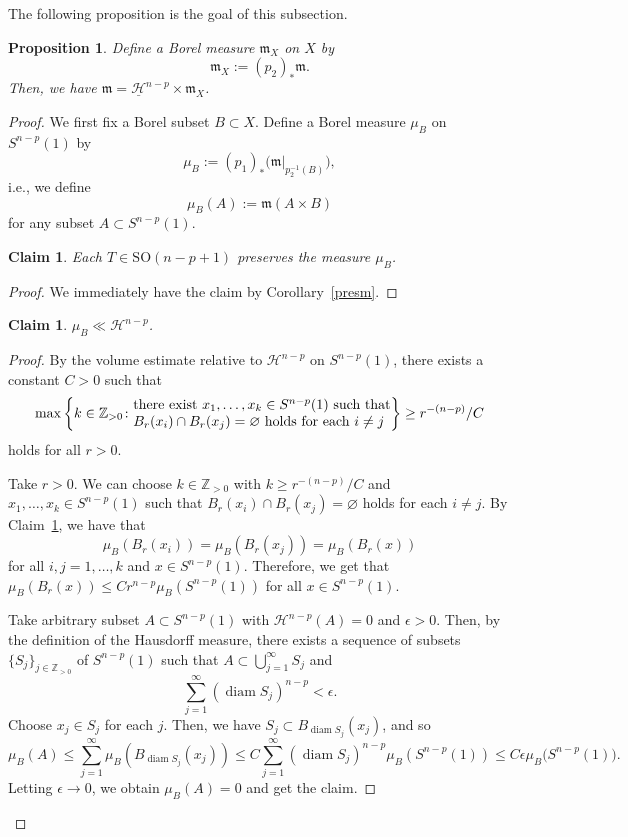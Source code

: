 \documentclass[pdftex]{sigma}
\numberwithin{equation}{section}
\newtheorem{Prop}[Thm]{Proposition}
\newtheorem{Clm}[Thm]{Claim}
\theoremstyle{definition}
\newcommand{\diam}{\operatorname{diam}}
\newcommand{\Z}{\mathbb{Z}}
\newcommand{\mf}{\mathfrak{m}}
\newcommand{\Ha}{\mathcal{H}}
\newcommand{\nHa}{\underline{\mathcal{H}}}
\begin{document}
The following proposition is the goal of this subsection.
\begin{Prop}\label{spms}
Define a Borel measure $\mf_X$ on $X$ by
\[
\mf_X:=(p_2)_\ast \mf.
\]
Then, we have $\mf=\nHa^{n-p}\times \mf_X$.
\end{Prop}
\begin{proof}
We first fix a Borel subset $B\subset X$. Define a Borel measure $\mu_B$ on $S^{n-p}(1)$ by
\[
\mu_B:=(p_1)_\ast \big(\mf|_{p_2^{-1}(B)}\big),
\]
i.e., we define
\[
\mu_B(A):=\mf(A\times B)
\]
for any subset $A\subset S^{n-p}(1)$.
\begin{Clm}\label{presmu}
Each $T\in \mathrm{SO}(n-p+1)$ preserves the measure $\mu_B$.
\end{Clm}
\begin{proof}
We immediately have the claim by Corollary~\ref{presm}.
\end{proof}
\begin{Clm}\label{ac}
$\mu_B\ll \Ha^{n-p}$.
\end{Clm}
\begin{proof}
By the volume estimate relative to $\Ha^{n-p}$ on $S^{n-p}(1)$, there exists a constant $C>0$ such that
\[
\max \left\{k\in\Z_{>0}\colon
\begin{array}{@{}l@{}}\text{there exist $x_1,\ldots,x_k\in S^{n-p}(1)$ such that}\\
\text{$B_r(x_i)\cap B_r(x_j)=\varnothing$ holds for each $i\neq j$}
\end{array}
\right\}\geq r^{-(n-p)}/C
\]
holds for all $r>0$.

Take $r>0$.
We can choose $k\in\Z_{>0}$ with $k\geq r^{-(n-p)}/C$ and $x_1,\ldots, x_k\in S^{n-p}(1)$ such that $B_r(x_i)\cap B_r(x_j)=\varnothing$ holds for each $i\neq j$.
By Claim~\ref{presmu}, we have that
\[
\mu_B(B_r(x_i))=\mu_B (B_r(x_j))=\mu_B(B_r(x))
\]
for all $i,j=1,\ldots,k$ and $x\in S^{n-p}(1)$.
Therefore, we get that $\mu_B(B_r(x))\leq Cr^{n-p}\mu_B(S^{n-p}(1))$ for all $x\in S^{n-p}(1)$.

Take arbitrary subset $A\subset S^{n-p}(1)$ with $\Ha^{n-p}(A)=0$ and $\epsilon>0$.
Then, by the definition of the Hausdorff measure, there exists a sequence of subsets $\{S_j\}_{j\in\Z_{>0}}$ of $S^{n-p}(1)$ such that
$A\subset \bigcup_{j=1}^\infty S_j$ and
\[
\sum_{j=1}^\infty (\diam S_j)^{n-p}<\epsilon.
\]
Choose $x_j\in S_j$ for each $j$.
Then, we have $S_j\subset B_{\diam S_j}(x_j)$, and so
\[
\mu_B(A)\leq \sum_{j=1}^\infty\mu_B(B_{\diam S_j}(x_j))
\leq C\sum_{j=1}^\infty (\diam S_j)^{n-p}\mu_B(S^{n-p}(1))\leq C\epsilon \mu_B\big(S^{n-p}(1)\big).
\]
Letting $\epsilon \to 0$, we obtain $\mu_B(A)=0$ and get the claim.
\end{proof}


\end{proof}
\end{document}
